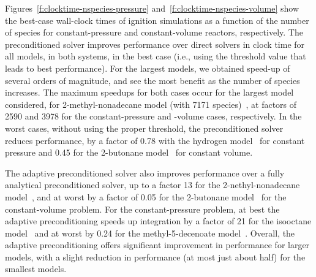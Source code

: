 \documentclass[twocolumn,10pt]{article}
\begin{document}
Figures~\ref{f:clocktime-nspecies-pressure} and~\ref{f:clocktime-nspecies-volume} show the best-case wall-clock times of ignition simulations as a function of the number of species for constant-pressure and constant-volume reactors, respectively.
The preconditioned solver improves performance over direct solvers in clock time for all models, in both systems, in the best case (i.e., using the threshold value that leads to best performance).
For the largest models, we obtained speed-up of several orders of magnitude, and see the most benefit as the number of species increases.
The maximum speedups for both cases occur for the largest model considered, for 2-methyl-nonadecane model (with 7171 species)~\cite{sarathy_comprehensive_2011}, at factors of 2590 and 3978 for the constant-pressure and -volume cases, respectively.
In the worst cases, without using the proper threshold, the preconditioned solver reduces performance, by a factor of 0.78 with the hydrogen model~\cite{smith_gri-mech_1999} for constant pressure and 0.45 for the 2-butonane model~\cite{hemken_2017} for constant volume.


The adaptive preconditioned solver also improves performance over a fully analytical preconditioned solver, up to a factor 13 for the 2-nethyl-nonadecane model~\cite{sarathy_comprehensive_2011}, and at worst by a factor of 0.05 for the 2-butonane model~\cite{hemken_2017} for the constant-volume problem.
For the constant-pressure problem, at best the adaptive preconditioning speeds up integration by a factor of 21 for the isooctane model~\cite{mehl_chemical_2009} and at worst by 0.24 for the methyl-5-decenoate model~\cite{herbinet_detailed_2010}.
Overall, the adaptive preconditioning offers significant improvement in performance for larger models, with a slight reduction in performance (at most just about half) for the smallest models.
\end{document}
